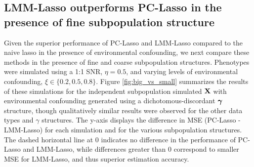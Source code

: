 \subsection{LMM-Lasso outperforms PC-Lasso in the presence of fine subpopulation structure}

Given the superior performance of PC-Lasso and LMM-Lasso compared to the naive lasso in the presence of environmental confounding, we next compare these methods in the presence of fine and coarse subpopulation structures. Phenotypes were simulated using a 1:1 SNR, $\eta = 0.5$, and varying levels of environmental confounding, $\xi \in \{0.2, 0.5,0.8\}$. Figure \ref{fig:big_vs_small} summarizes the results of these simulations for the independent subpopulation simulated $\textbf{X}$ with environmental confounding generated using a dichotomous-discordant $\boldsymbol{\gamma}$ structure, though qualitatively similar results were observed for the other data types and $\gamma$ structures. The y-axis displays the difference in MSE (PC-Lasso - LMM-Lasso) for each simulation and for the various subpopulation structures. The dashed horizontal line at 0 indicates no difference in the performance of PC-Lasso and LMM-Lasso, while differences greater than 0 correspond to smaller MSE for LMM-Lasso, and thus superior estimation accuracy. 

